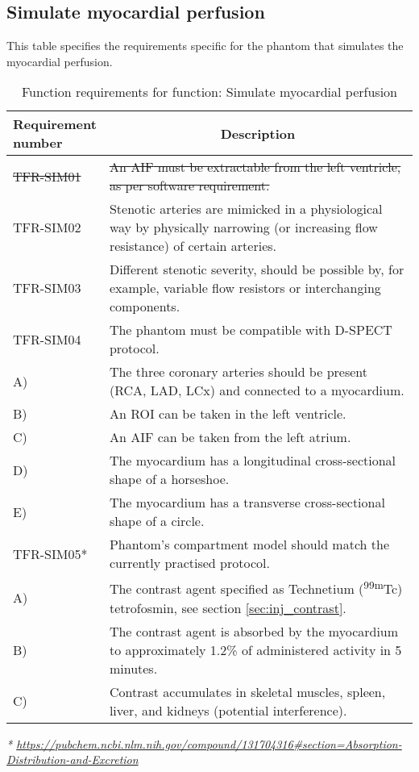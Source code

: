 \subsection{Simulate myocardial perfusion}
\begin{table} [H]
\caption{Function requirements for function: Simulate myocardial perfusion}
\label{tab:funcsim}
This table specifies the requirements specific for the phantom that simulates the myocardial perfusion.
\begin{tabular}{l|p{120mm}|}
	\makecell[l]{\textbf{Requirement} \\  \textbf{number}} & \multicolumn{1}{c}{\textbf{Description}}\\
	\hline
	\sout{TFR-SIM01} & \sout{An \ac{AIF} must be extractable from the left ventricle, as per software requirement.}\\
	TFR-SIM02 & Stenotic arteries are mimicked in a physiological way by physically narrowing (or increasing flow resistance) of certain arteries. \\
	TFR-SIM03 & Different stenotic severity, should be possible by, for example, variable flow resistors or interchanging components. \\
	TFR-SIM04 & The phantom must be compatible with D-SPECT protocol. \\
	\hspace{1.5cm} A) & The three coronary arteries should be present (RCA, LAD, LCx) and connected to a myocardium. \\
	\hspace{1.5cm} B) & An ROI can be taken in the left ventricle. \\
	\hspace{1.5cm} C) & An AIF can be taken from the left atrium. \\
	\hspace{1.5cm} D) & The myocardium has a longitudinal cross-sectional shape of a horseshoe. \\
	\hspace{1.5cm} E) & The myocardium has a transverse cross-sectional shape of a circle. \\
	TFR-SIM05* & Phantom's compartment model should match the currently practised protocol.\\
	\hspace{1.5cm} A) & The contrast agent specified as Technetium (\textsuperscript{99m}Tc) tetrofosmin, see section \ref{sec:inj_contrast}. \\
	\hspace{1.5cm} B) & The contrast agent is absorbed by the myocardium to approximately 1.2\% of administered activity in 5 minutes. \\
	\hspace{1.5cm} C) & Contrast accumulates in skeletal muscles, spleen, liver, and kidneys (potential interference). \\
	\cline{2-2}
\end{tabular}
\raggedright
\textit{* \url{https://pubchem.ncbi.nlm.nih.gov/compound/131704316\#section=Absorption-Distribution-and-Excretion}}
\end{table}


